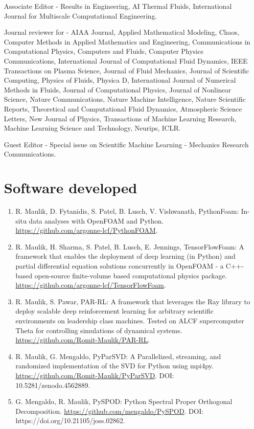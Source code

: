 \documentclass[letterpaper]{article}
\renewenvironment{itemize}{
  \begin{list}{}{
    \setlength{\leftmargin}{1.5em}
  }
}{
  \end{list}
}
\begin{document}
\begin{itemize}
  \item Associate Editor - Results in Engineering, AI Thermal Fluids, International Journal for Multiscale Computational Engineering.
  \item Journal reviewer for - AIAA Journal, Applied Mathematical Modeling, Chaos, Computer Methods in Applied Mathematics and Engineering, Communications in Computational Physics, Computers and Fluids, Computer Physics Communications, International Journal of Computational Fluid Dynamics, IEEE Transactions on Plasma Science, Journal of Fluid Mechanics, Journal of Scientific Computing, Physics of Fluids, Physica D, International Journal of Numerical Methods in Fluids, Journal of Computational Physics, Journal of Nonlinear Science, Nature Communications, Nature Machine Intelligence, Nature Scientific Reports, Theoretical and Computational Fluid Dynamics, Atmospheric Science Letters, New Journal of Physics, Transactions of Machine Learning Research, Machine Learning Science and Technology, Neurips, ICLR.
  \item Guest Editor - Special issue on Scientific Machine Learning - Mechanics Research Communications.
\end{itemize}

\section*{Software developed}

\begin{enumerate}

\item R. Maulik, D. Fytanidis, S. Patel, B. Lusch, V. Vishwanath, PythonFoam: In-situ data analyses with OpenFOAM and Python. \url{https://github.com/argonne-lcf/PythonFOAM}.

\item R. Maulik, H. Sharma, S. Patel, B. Lusch, E. Jennings, TensorFlowFoam: A framework that enables the deployment of deep learning (in Python) and partial differential equation solutions concurrently in OpenFOAM - a C++-based open-source finite-volume based computational physics package. \url{https://github.com/argonne-lcf/TensorFlowFoam}.

\item R. Maulik, S. Pawar, PAR-RL: A framework that leverages the Ray library to deploy scalable deep reinforcement learning for arbitrary scientific environments on leadership class machines. Tested on ALCF supercomputer Theta for controlling simulations of dynamical systems. \url{https://github.com/Romit-Maulik/PAR-RL}.

\item R. Maulik, G. Mengaldo, PyParSVD: A Parallelized, streaming, and randomized implementation of the SVD for Python using mpi4py. \url{https://github.com/Romit-Maulik/PyParSVD}. DOI: 10.5281/zenodo.4562889.

\item G. Mengaldo, R. Maulik, PySPOD: Python Spectral Proper Orthogonal Decomposition. \url{https://github.com/mengaldo/PySPOD}.  DOI: https://doi.org/10.21105/joss.02862.

\end{enumerate}
\end{document}

